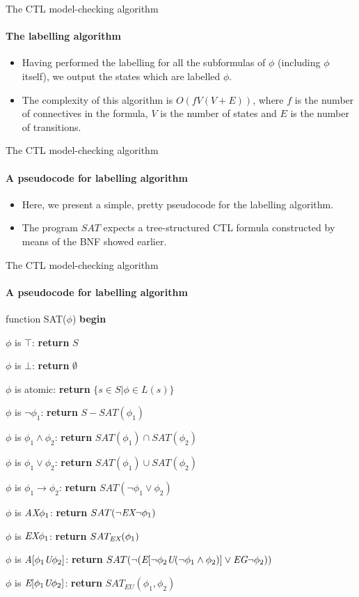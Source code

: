 \begin{frame}{The CTL model-checking algorithm}
	\framesubtitle{The labelling algorithm}
	\begin{itemize}
		\item
		{
			Having performed the labelling for all the subformulas of $\phi$ (including $\phi$
			itself), we output the states which are labelled $\phi$.
			\pause
		}
		\item
		{
			The complexity of this algorithm is $O(f V (V + E))$, where $f$ is the number of connectives in the formula, $V$ is the number of states and $E$ is the number of transitions.
		}
	\end{itemize}
\end{frame}

\begin{frame}{The CTL model-checking algorithm}
	\framesubtitle{A pseudocode for labelling algorithm}
	\begin{itemize}
		\item
		{
			Here, we present a simple, pretty pseudocode for the labelling algorithm.
			\pause
		}
		\item
		{
			The program $SAT$ expects a tree-structured CTL formula constructed by means of the BNF showed earlier.
		}
	\end{itemize}
\end{frame}

\begin{frame}{The CTL model-checking algorithm}
	\framesubtitle{A pseudocode for labelling algorithm}
		function SAT($\phi$)
		{\bf begin}\\
		
		\qquad  $\phi$ is $\top$: {\bf return} $S$
		
		\qquad  $\phi$ is $\bot$: {\bf return} $\emptyset$
		
		\qquad  $\phi$ is atomic: {\bf return} $\{ s \in S | \phi \in L(s) \}$
		
		\qquad  $\phi$ is $\neg \phi_{1}$: {\bf return} $S - SAT(\phi_{1})$
		
		\qquad  $\phi$ is $\phi_{1} \land \phi_{2}$: {\bf return} $SAT(\phi_{1}) \cap SAT(\phi_{2})$
		
		\qquad  $\phi$ is $\phi_{1} \lor \phi_{2}$: {\bf return} $SAT(\phi_{1}) \cup SAT(\phi_{2})$
		
		\qquad  $\phi$ is $\phi_{1} \rightarrow \phi_{2}$: {\bf return} $SAT(\neg \phi_{1} \lor \phi_{2})$
		
		\qquad  $\phi$ is $\textit{A}\textit{X} \phi_{1}$: {\bf return} $SAT(\neg\textit{E}\textit{X}\neg \phi_{1})$
		
		\qquad  $\phi$ is $\textit{E}\textit{X} \phi_{1}$: {\bf return} $SAT_{\textit{E}\textit{X}}(\phi_{1})$
		
		\qquad  $\phi$ is $\textit{A}[\phi_{1} \textit{U} \phi_{2}]$: {\bf return} $SAT(\neg( \textit{E}[\neg \phi_{2} \textit{U} (\neg \phi_{1} \land \phi_{2})] \lor \textit{E}\textit{G}\neg \phi_{2} ))$
		
		\qquad  $\phi$ is $\textit{E}[\phi_{1} \textit{U} \phi_{2}]$: {\bf return} $SAT_{EU}(\phi_{1}, \phi_{2})$\\
		
\end{frame}

